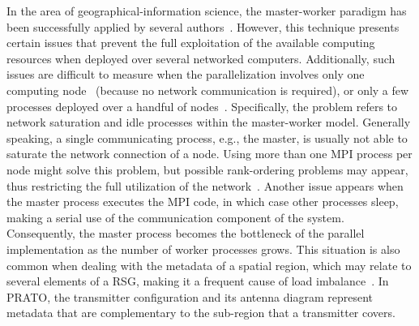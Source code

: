 In the area of geographical-information science, the master-worker
paradigm has been successfully applied by several authors~\cite{Akhter-GRASS_GIS_on_high_performance_computing_with_MPI_OpenMP_and_Ninf-G:2010,Akhter_Porting_GRASS_raster_module_to_distributed_computing:2007,Campos_Parallel_modelling_in_GIS:2012,Guan_A_parallel_computing_approach_to_fast_geostatistical_areal_interpolation:2011,Huang-Explorations_of_the_implementation_of_a_parallel_IDW_algorithm_in_a_Linux_cluster:2011,Tabik-High_performance_three_horizon_composition_algorithm_for_large_scale_terrains:2011,Tabik-Optimal_tilt_and_orientation_maps_a_multi_algorithm_approach_for_heterogeneous_multicore_GPU_systems:2013}.
However, this technique presents certain issues that prevent the full
exploitation of the available computing resources when deployed over
several networked computers. Additionally, such issues are difficult
to measure when the parallelization involves only one computing node~\cite{Tabik-High_performance_three_horizon_composition_algorithm_for_large_scale_terrains:2011,Tabik-Optimal_tilt_and_orientation_maps_a_multi_algorithm_approach_for_heterogeneous_multicore_GPU_systems:2013}
(because no network communication is required), or only a few processes
deployed over a handful of nodes~\cite{Huang-Explorations_of_the_implementation_of_a_parallel_IDW_algorithm_in_a_Linux_cluster:2011}.
Specifically, the problem refers to network saturation and idle processes
within the master-worker model. Generally speaking, a single communicating
process, e.g., the master, is usually not able to saturate the network
connection of a node. Using more than one MPI process per node might
solve this problem, but possible rank-ordering problems may appear,
thus restricting the full utilization of the network~\cite{Rabenseifner-Hybrid_MPI_OpenMP_parallel_programming_on_clusters_of_multicore_nodes:2009}.
Another issue appears when the master process executes the MPI code,
in which case other processes sleep, making a serial use of the communication
component of the system. Consequently, the master process becomes
the bottleneck of the parallel implementation as the number of worker
processes grows. This situation is also common when dealing with the
metadata of a spatial region, which may relate to several elements
of a RSG, making it a frequent cause of load imbalance~\cite{Gong_Parallel_agent_based_simulation_of_individual_level_spatial_interactions_within_a_multicore_computing_environment:2012,Hawick_Distributed_frameworks_and_parallel_algorithms_for_processing_large_scala_geographic_data:2003,Widener_Developing_a_parallel_computational_implementation_of_AMOEBA:2012}.
In PRATO, the transmitter configuration and its antenna diagram represent
metadata that are complementary to the sub-region that a transmitter
covers.


